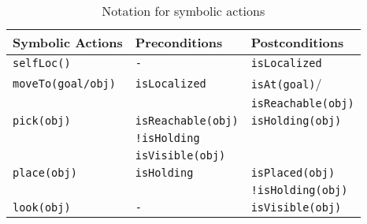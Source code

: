 
\begin{table}[h]
\caption{Notation for symbolic actions}%
\centering %
\begin{tabular}{p{2.5cm}p{2.5cm}p{2.5cm}} %
\toprule
    \textbf{Symbolic Actions}& \textbf{Preconditions}& \textbf{Postconditions}\\ 
    \midrule
    \texttt{selfLoc()} & \texttt{-} & \texttt{isLocalized} \\
    \texttt{moveTo(goal\slash obj)} & \texttt{isLocalized} & \texttt{isAt(goal)}\slash \\
    & & \texttt{isReachable(obj)} \\  
    \texttt{pick(obj)} & \texttt{isReachable(obj)}& \texttt{isHolding(obj)}\\ 
     & \texttt{!isHolding} & \\
     & \texttt{isVisible(obj)} & \\
    \texttt{place(obj)} & \texttt{isHolding}& \texttt{isPlaced(obj)}\\
    &  & \texttt{!isHolding(obj)}\\
    \texttt{look(obj)} & \texttt{-} & \texttt{isVisible(obj)}\\
    \bottomrule
\end{tabular}
\end{table}
%
%

